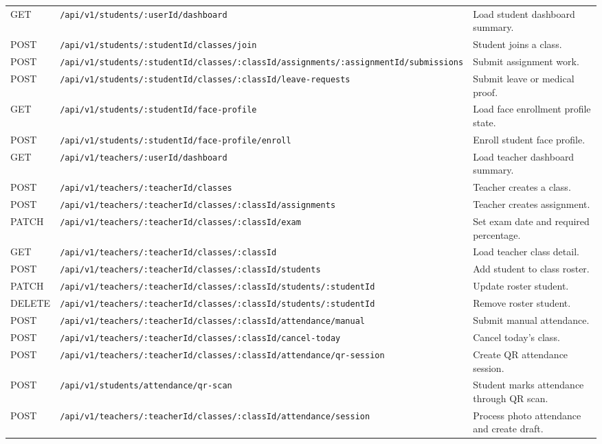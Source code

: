 \begin{longtable}{p{2cm} p{6.2cm} p{5.5cm}}
GET & \texttt{/api/v1/students/:userId/dashboard} & Load student dashboard summary.\\
POST & \texttt{/api/v1/students/:studentId/classes/join} & Student joins a class.\\
POST & \texttt{/api/v1/students/:studentId/classes/:classId/assignments/:assignmentId/submissions} & Submit assignment work.\\
POST & \texttt{/api/v1/students/:studentId/classes/:classId/leave-requests} & Submit leave or medical proof.\\
GET & \texttt{/api/v1/students/:studentId/face-profile} & Load face enrollment profile state.\\
POST & \texttt{/api/v1/students/:studentId/face-profile/enroll} & Enroll student face profile.\\
GET & \texttt{/api/v1/teachers/:userId/dashboard} & Load teacher dashboard summary.\\
POST & \texttt{/api/v1/teachers/:teacherId/classes} & Teacher creates a class.\\
POST & \texttt{/api/v1/teachers/:teacherId/classes/:classId/assignments} & Teacher creates assignment.\\
PATCH & \texttt{/api/v1/teachers/:teacherId/classes/:classId/exam} & Set exam date and required percentage.\\
GET & \texttt{/api/v1/teachers/:teacherId/classes/:classId} & Load teacher class detail.\\
POST & \texttt{/api/v1/teachers/:teacherId/classes/:classId/students} & Add student to class roster.\\
PATCH & \texttt{/api/v1/teachers/:teacherId/classes/:classId/students/:studentId} & Update roster student.\\
DELETE & \texttt{/api/v1/teachers/:teacherId/classes/:classId/students/:studentId} & Remove roster student.\\
POST & \texttt{/api/v1/teachers/:teacherId/classes/:classId/attendance/manual} & Submit manual attendance.\\
POST & \texttt{/api/v1/teachers/:teacherId/classes/:classId/cancel-today} & Cancel today's class.\\
POST & \texttt{/api/v1/teachers/:teacherId/classes/:classId/attendance/qr-session} & Create QR attendance session.\\
POST & \texttt{/api/v1/students/attendance/qr-scan} & Student marks attendance through QR scan.\\
POST & \texttt{/api/v1/teachers/:teacherId/classes/:classId/attendance/session} & Process photo attendance and create draft.\\

\end{longtable}
